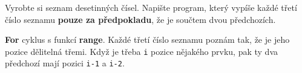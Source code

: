 \question[70]
Vyrobte si seznam desetinných čísel. Napište program, který vypíše každé třetí
číslo seznamu \textbf{pouze za předpokladu}, že je součtem dvou předchozích.

\textbf{For} cyklus s funkcí \textbf{range}. Každé třetí číslo seznamu poznám
tak, že je jeho pozice dělitelná třemi. Když je třeba \texttt{i} pozice nějakého
prvku, pak ty dva předchozí mají pozici \texttt{i-1} a \texttt{i-2}.